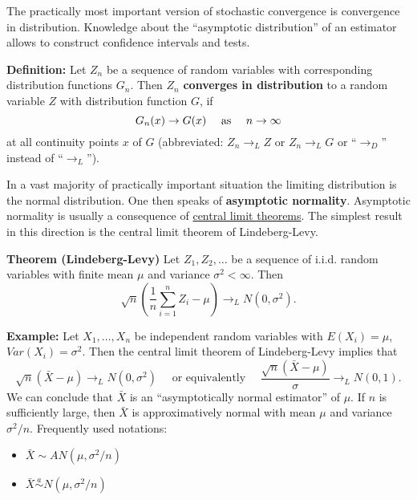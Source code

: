 \documentclass[
]{book}
\providecommand{\tightlist}{%
  \setlength{\itemsep}{0pt}\setlength{\parskip}{0pt}}
\begin{document}
The practically most important version of stochastic convergence is convergence in distribution. Knowledge about the ``asymptotic distribution'' of an estimator allows to construct confidence intervals and tests.

\hfill\break

\textbf{Definition:} Let \(Z_n\) be a sequence of random variables with corresponding distribution functions \(G_n\). Then \(Z_n\) \textbf{converges in distribution} to a random variable \(Z\) with distribution function \(G\), if
\[G_n(x)\to G(x)\quad\hbox{ as }\quad n\to\infty \]
at all continuity points \(x\) of \(G\) (abbreviated: \(Z_n\to_L Z\) or \(Z_n\to_L G\) or ``\(\to_D\)'' instead of ``\(\to_L\)'').

\hfill\break

In a vast majority of practically important situation the limiting distribution is the normal distribution. One then speaks of \textbf{asymptotic normality}. Asymptotic normality is usually a consequence of \href{https://www.statlect.com/asymptotic-theory/central-limit-theorem\%5D}{central limit theorems}. The simplest result in this direction is the central limit theorem of Lindeberg-Levy.

\hfill\break

\textbf{Theorem (Lindeberg-Levy)} Let \(Z_1,Z_2,\dots\) be a sequence of i.i.d. random variables with
finite mean \(\mu\) and variance \(\sigma^2<\infty\). Then
\[\sqrt{n}\left(\frac{1}{n} \sum_{i=1}^n Z_i -\mu\right)\rightarrow_L N(0,\sigma^2).\]

\hfill\break

\textbf{Example:} Let \(X_1,\dots,X_n\) be independent random variables
with \(E(X_i)=\mu\), \(Var(X_i)=\sigma^2\). Then the central limit theorem of Lindeberg-Levy implies that
\[\sqrt{n}(\bar X -\mu ) \to_L N(0,\sigma^2)\quad\text{ or equivalently }\quad
\frac{\sqrt{n}(\bar X -\mu )}{\sigma}\to_L N(0,1).\]
We can conclude that \(\bar X\) is an ``asymptotically normal estimator'' of \(\mu\). If \(n\) is sufficiently large, then \(\bar X\) is approximatively normal with mean \(\mu\) and variance \(\sigma^2/n\). Frequently used notations:

\begin{itemize}
\tightlist
\item
  \(\bar X\sim AN(\mu,\sigma^2/n)\)
\item
  \(\bar X\overset{a}{\sim}N(\mu,\sigma^2/n)\)
\end{itemize}

\hfill\break
\end{document}
